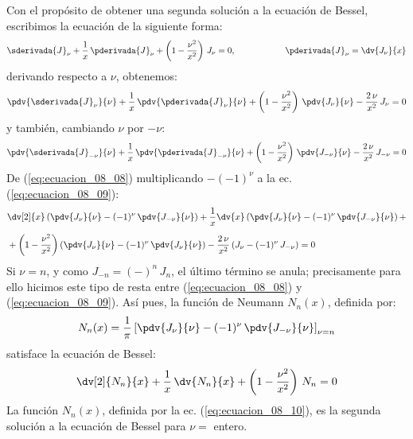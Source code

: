 Con el propósito de obtener una segunda solución a la ecuación de Bessel, escribimos la ecuación de la siguiente forma:
\begin{align*}
\sderivada{J}_{\nu} + \dfrac{1}{x} \, \pderivada{J}_{\nu}  + \left( 1 - \dfrac{\nu^{2}}{x^{2}} \right) \, J_{\nu} = 0, \hspace{2cm} \pderivada{J}_{\nu} =  \dv{J_{\nu}}{x}
\end{align*}
derivando respecto a $\nu$, obtenemos:
\begin{align}
\pdv{\sderivada{J}_{\nu}}{\nu} + \dfrac{1}{x} \, \pdv{\pderivada{J}_{\nu}}{\nu} + \left( 1 - \dfrac{\nu^{2}}{x^{2}} \right) \, \pdv{J_{\nu}}{\nu} - \dfrac{2  \, \nu}{x^{2}} \, J_{\nu} = 0
\label{eq:ecuacion_08_08} 
\end{align}
y también, cambiando $\nu$ por $-\nu$:
\begin{align}
\pdv{\sderivada{J}_{-\nu}}{\nu} + \dfrac{1}{x} \, \pdv{\pderivada{J}_{-\nu}}{\nu} + \left( 1 - \dfrac{\nu^{2}}{x^{2}} \right) \, \pdv{J_{-\nu}}{\nu} - \dfrac{2 \, \nu}{x^{2}} \, J_{-\nu} = 0
\label{eq:ecuacion_08_09} 
\end{align}
De (\ref{eq:ecuacion_08_08}) multiplicando $-(-1)^{\nu}$ a la ec. (\ref{eq:ecuacion_08_09}):
\begin{align*}
&\dv[2]{x} \left( \pdv{J_{\nu}}{\nu} - (-1)^{\nu} \, \pdv{J_{-\nu}}{\nu} \right) + \dfrac{1}{x} \dv{x} \left( \pdv{J_{\nu}}{\nu} - (-1)^{\nu} \,\pdv{J_{-\nu}}{\nu} \right) + \\[0.5em]
&+ \left( 1 - \dfrac{\nu^{2}}{x^{2}} \right) \left( \pdv{J_{\nu}}{\nu} - (-1)^{\nu}  \, \pdv{J_{\nu}}{\nu} \right) - \dfrac{2 \, \nu}{x^{2}} \, (J_{\nu} - (-1)^{\nu} \, J_{-\nu}) = 0
\end{align*}
Si $\nu = n$, y como $J_{-n} = (-)^{n} \, J_{n}$, el último término se anula; precisamente para ello hicimos este tipo de resta entre (\ref{eq:ecuacion_08_08}) y (\ref{eq:ecuacion_08_09}). Así pues, la función de Neumann $N_{n}(x)$, definida por:
\begin{align}
N_{n} (x) = \dfrac{1}{\pi} \left[ \pdv{J_{\nu}}{\nu} - (-1)^{\nu} \, \pdv{J_{-\nu}}{\nu} \right]_{\nu = n}
\label{eq:ecuacion_08_10}
\end{align}
satisface la ecuación de Bessel:
\begin{align*}
\dv[2]{N_{n}}{x} + \dfrac{1}{x} \, \dv{N_{n}}{x} + \left( 1 - \dfrac{\nu^{2}}{x^{2}} \right) \, N_{n} = 0
\end{align*}
La función $N_{n}(x)$, definida por la ec. (\ref{eq:ecuacion_08_10}), es la segunda solución a la ecuación de Bessel para $\nu =$ entero.
